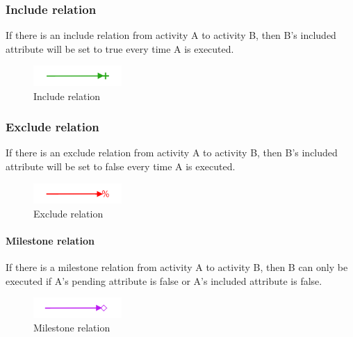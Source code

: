 \documentclass{article}
\begin{document}
	\subsubsection{Include relation}
	If there is an include relation from activity A to activity B, then B's included attribute will be set to true every time A is executed.
	\begin{figure}[!ht]
		\centering
		\includegraphics[width=0.3\textwidth]{figures/IncludeRelation.png}
	 	\caption[Include relation]
	 	{Include relation}
	\end{figure}

	\subsubsection{Exclude relation}
	If there is an exclude relation from activity A to activity B, then B's included attribute will be set to false every time A is executed.
	\begin{figure}[!ht]
		\centering
		\includegraphics[width=0.3\textwidth]{figures/ExcludeRelation.png}
	 	\caption[Exclude relation]
	 	{Exclude relation}
	\end{figure}

	\paragraph{Milestone relation}
	If there is a milestone relation from activity A to activity B, then B can only be executed if A's pending attribute is false or A's included attribute is false.
	\begin{figure}[!ht]
		\centering
		\includegraphics[width=0.3\textwidth]{figures/MilestoneRelation.png}
	 	\caption[Milestone relation]
	 	{Milestone relation}
	\end{figure}
\end{document}
